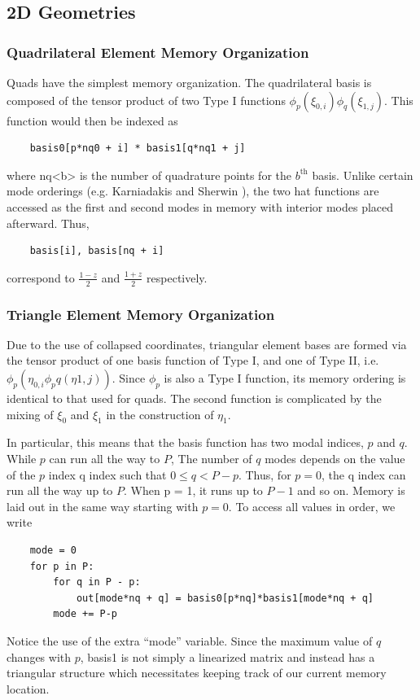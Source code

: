 \subsection{2D Geometries}

\subsubsection{Quadrilateral Element Memory Organization}
Quads have the simplest memory organization. The quadrilateral basis is composed of the tensor product of two Type I functions $\phi_p(\xi_{0,i}) \phi_q(\xi_{1,j})$. This function would then be indexed as

\begin{lstlisting}
    basis0[p*nq0 + i] * basis1[q*nq1 + j]
\end{lstlisting}
where nq<b> is the number of quadrature points for the $b^{\text{th}}$ basis. Unlike certain mode orderings (e.g. Karniadakis and Sherwin \cite{KaSh05}), the two hat functions are accessed as the first and second modes in memory with interior modes placed afterward. Thus,
\begin{lstlisting}
    basis[i], basis[nq + i]
\end{lstlisting}
correspond to $\frac{1 - z}{2}$ and $\frac{1 + z}{2}$ respectively.

\subsubsection{Triangle Element Memory Organization}
Due to the use of collapsed coordinates, triangular element bases are formed via the tensor product of one basis function of Type I, and one of Type II, i.e. $\phi_p(\eta_{0,i} \phi_pq(\eta{1,j}))$. Since $\phi_p$ is also a Type I function, its memory ordering is identical to that used for quads. The second function is complicated by the mixing of $\xi_0$ and $\xi_1$ in the construction of $\eta_1$.

In particular, this means that the basis function has two modal indices, $p$ and $q$. While $p$ can run all the way to $P$, The number of $q$ modes depends on the value of the $p$ index q index such that $0 \leq q < P - p$. Thus, for $p = 0$, the q index can run all the way up to $P$. When p = 1, it runs up to $P - 1$ and so on. Memory is laid out in the same way starting with $p=0$. To access all values in order, we write
\begin{lstlisting}
    mode = 0
    for p in P:
        for q in P - p:
            out[mode*nq + q] = basis0[p*nq]*basis1[mode*nq + q]
        mode += P-p
\end{lstlisting}
Notice the use of the extra ``mode'' variable. Since the maximum value of $q$ changes with $p$, basis1 is not simply a linearized matrix and instead has a triangular structure which necessitates keeping track of our current memory location.

